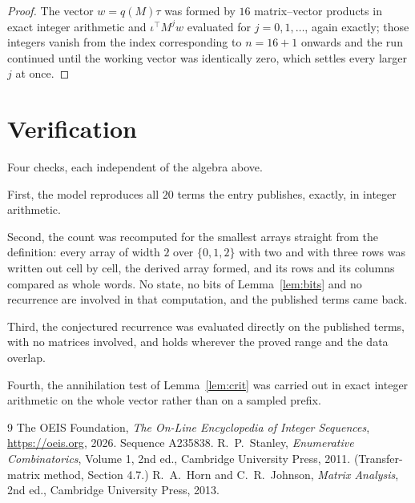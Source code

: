 \documentclass[11pt,a4paper]{article}
\theoremstyle{plain}
\theoremstyle{definition}
\begin{document}
\begin{proof}
The vector $w=q(M)\tau$ was formed by $16$ matrix--vector products in exact integer
arithmetic and $\iota^{\!\top}M^{j}w$ evaluated for $j=0,1,\dots$, again exactly; those
integers vanish from the index corresponding to $n=16+1$ onwards and the run continued
until the working vector was identically zero, which settles every larger $j$ at once.
\end{proof}

\section{Verification}

Four checks, each independent of the algebra above.

First, the model reproduces all $20$ terms the entry publishes, exactly, in integer
arithmetic.

Second, the count was recomputed for the smallest arrays straight from the definition: every
array of width $2$ over $\{0,1,2\}$ with two and with three rows was written out cell by cell,
the derived array formed, and its rows and its columns compared as whole words. No state, no
bits of Lemma~\ref{lem:bits} and no recurrence are involved in that computation, and the
published terms came back.

Third, the conjectured recurrence was evaluated directly on the published terms, with no
matrices involved, and holds wherever the proved range and the data overlap.

Fourth, the annihilation test of Lemma~\ref{lem:crit} was carried out in exact integer
arithmetic on the whole vector rather than on a sampled prefix.

\begin{thebibliography}{9}
 The OEIS Foundation, \emph{The On-Line Encyclopedia of Integer
Sequences}, \url{https://oeis.org}, 2026. Sequence A235838.
 R.~P.~Stanley, \emph{Enumerative Combinatorics}, Volume 1, 2nd ed.,
Cambridge University Press, 2011. (Transfer-matrix method, Section 4.7.)
 R.~A.~Horn and C.~R.~Johnson, \emph{Matrix Analysis}, 2nd ed., Cambridge
University Press, 2013.
\end{thebibliography}
\end{document}
